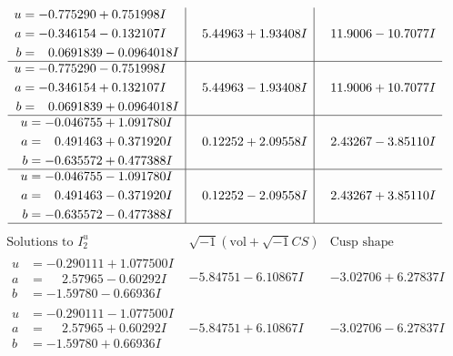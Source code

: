 \documentclass[1p]{elsarticle_modified}
\theoremstyle{definition}
\newcommand{\I}{\sqrt{-1}}
\begin{document}
$$\begin{array}{c|c|c}
\begin{aligned}
u &= -0.775290 + 0.751998 I \\
a &= -0.346154 - 0.132107 I \\
b &= \phantom{-}0.0691839 - 0.0964018 I\end{aligned}
 & \phantom{-}5.44963 + 1.93408 I & \phantom{-}11.9006 - 10.7077 I \\ \hline\begin{aligned}
u &= -0.775290 - 0.751998 I \\
a &= -0.346154 + 0.132107 I \\
b &= \phantom{-}0.0691839 + 0.0964018 I\end{aligned}
 & \phantom{-}5.44963 - 1.93408 I & \phantom{-}11.9006 + 10.7077 I \\ \hline\begin{aligned}
u &= -0.046755 + 1.091780 I \\
a &= \phantom{-}0.491463 + 0.371920 I \\
b &= -0.635572 + 0.477388 I\end{aligned}
 & \phantom{-}0.12252 + 2.09558 I & \phantom{-}2.43267 - 3.85110 I \\ \hline\begin{aligned}
u &= -0.046755 - 1.091780 I \\
a &= \phantom{-}0.491463 - 0.371920 I \\
b &= -0.635572 - 0.477388 I\end{aligned}
 & \phantom{-}0.12252 - 2.09558 I & \phantom{-}2.43267 + 3.85110 I\\
 \hline 
 \end{array}$$\newpage$$\begin{array}{c|c|c}  
\text{Solutions to }I^u_{2}& \I (\text{vol} + \sqrt{-1}CS) & \text{Cusp shape}\\
 \hline 
\begin{aligned}
u &= -0.290111 + 1.077500 I \\
a &= \phantom{-}2.57965 - 0.60292 I \\
b &= -1.59780 - 0.66936 I\end{aligned}
 & -5.84751 - 6.10867 I & -3.02706 + 6.27837 I \\ \hline\begin{aligned}
u &= -0.290111 - 1.077500 I \\
a &= \phantom{-}2.57965 + 0.60292 I \\
b &= -1.59780 + 0.66936 I\end{aligned}
 & -5.84751 + 6.10867 I & -3.02706 - 6.27837 I \\ \hline\begin{aligned}

\end{aligned}
\end{array}$$
\end{document}
